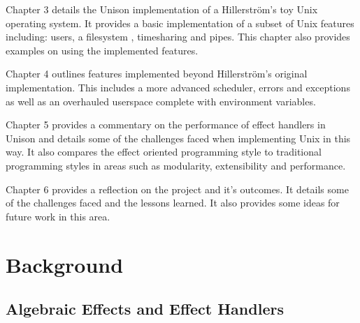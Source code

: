 \documentclass[logo,bsc,singlespacing,parskip]{infthesis}
\begin{document}
Chapter 3 details the Unison implementation of a Hillerstr\"{o}m's toy Unix
operating system. It provides a basic implementation of a subset of Unix
features including: users, a filesystem , timesharing and pipes. This chapter
also provides examples on using the implemented features.

Chapter 4 outlines features implemented beyond Hillerstr\"{o}m's original
implementation. This includes a more advanced scheduler, errors and exceptions
as well as an overhauled userspace complete with environment variables.

Chapter 5 provides a commentary on the performance of effect handlers in Unison
and details some of the challenges faced when implementing Unix in this way.
It also compares the effect oriented programming style to traditional
programming styles in areas such as modularity, extensibility and performance.

Chapter 6 provides a reflection on the project and it's outcomes. It details
some of the challenges faced and the lessons learned. It also provides some
ideas for future work in this area.

\chapter{Background}

\section{Algebraic Effects and Effect Handlers}
\end{document}
